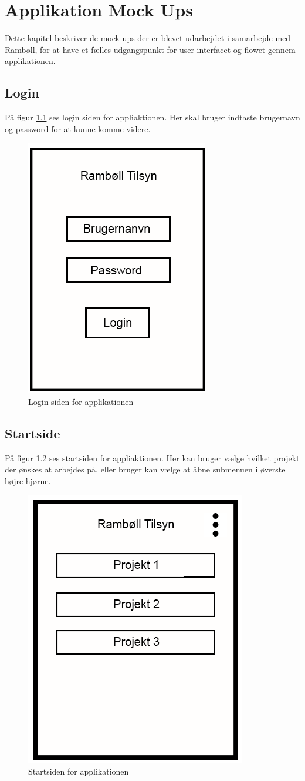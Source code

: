 \chapter{Applikation Mock Ups}
Dette kapitel beskriver de mock ups der er blevet udarbejdet i samarbejde med Rambøll, for at have et fælles udgangspunkt for user interfacet og flowet gennem applikationen. \\

\section{Login}\label{sec:LoginMock}
På figur \ref{fig:LoginMock} ses login siden for appliaktionen. Her skal bruger indtaste brugernavn og password for at kunne komme videre.
\begin{figure}[H]
	\centering
	\includegraphics[width=0.4\linewidth]{MockUps/Mock/Ramboell-Login}
	\caption{Login siden for applikationen}
	\label{fig:LoginMock}
\end{figure}

\clearpage

\section{Startside}\label{sec:StartMock}
På figur \ref{fig:StartMock} ses startsiden for appliaktionen. Her kan bruger vælge hvilket projekt der ønskes at arbejdes på, eller bruger kan vælge at åbne submenuen i øverste højre hjørne.
\begin{figure}[H]
	\centering
	\includegraphics[width=0.4\linewidth]{MockUps/Mock/Ramboell-Startside}
	\caption{Startsiden for applikationen}
	\label{fig:StartMock}
\end{figure}

